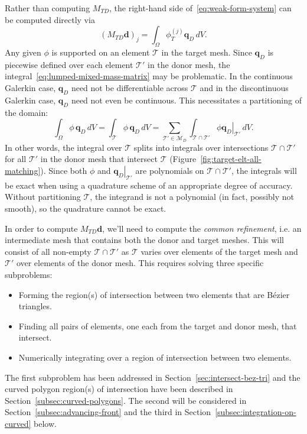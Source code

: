Rather than computing \(M_{TD}\), the right-hand side
of~\eqref{eq:weak-form-system} can be computed directly via
\begin{equation}\label{eq:lumped-mixed-mass-matrix}
\left(M_{TD} \bm{d}\right)_j = \int_{\Omega} \phi_T^{(j)} \bm{q}_D \, dV.
\end{equation}
Any given \(\phi\) is supported on an element \(\mathcal{T}\) in the
target mesh. Since \(\bm{q}_D\) is piecewise defined over each element
\(\mathcal{T}'\) in the donor mesh, the
integral~\eqref{eq:lumped-mixed-mass-matrix} may be problematic.
In the continuous Galerkin case, \(\bm{q}_D\) need not be differentiable
across \(\mathcal{T}\) and in the discontinuous Galerkin case,
\(\bm{q}_D\) need not even be continuous. This necessitates a
partitioning of the domain:
\begin{equation}
\int_{\Omega} \phi \, \bm{q}_D \, dV =
  \int_{\mathcal{T}} \phi \, \bm{q}_D \, dV =
  \sum_{\mathcal{T}' \in \mathcal{M}_D} \int_{\mathcal{T} \cap \mathcal{T}'}
    \phi \left.\bm{q}_D\right|_{\mathcal{T}'} \, dV.
\end{equation}
In other words, the integral over \(\mathcal{T}\) splits into integrals
over intersections \(\mathcal{T} \cap \mathcal{T}'\) for all
\(\mathcal{T}'\) in the donor mesh that intersect \(\mathcal{T}\)
(Figure~\ref{fig:target-elt-all-matching}). Since both \(\phi\) and
\(\left.\bm{q}_D\right|_{\mathcal{T}'}\) are polynomials on
\(\mathcal{T} \cap \mathcal{T}'\), the integrals will be exact when
using a quadrature scheme of an appropriate degree of accuracy.
Without partitioning \(\mathcal{T}\), the integrand is not a polynomial
(in fact, possibly not smooth), so the quadrature cannot be exact.

In order to compute \(M_{TD} \bm{d}\), we'll need to compute the
\emph{common refinement}, i.e. an intermediate mesh that contains
both the donor and target meshes. This will consist of all non-empty
\(\mathcal{T} \cap \mathcal{T}'\) as \(\mathcal{T}\) varies over
elements of the target mesh and \(\mathcal{T}'\) over elements of the
donor mesh. This requires solving three specific subproblems:
\begin{itemize}
\itemsep 0em
\item Forming the region(s) of intersection between two elements that
  are B\'{e}zier triangles.
\item Finding all pairs of elements, one each from the target and donor mesh,
  that intersect.
\item Numerically integrating over a region of intersection between two
  elements.
\end{itemize}
The first subproblem has been addressed in Section~\ref{sec:intersect-bez-tri}
and the curved polygon region(s) of intersection have been described
in Section~\ref{subsec:curved-polygons}. The second will be considered
in Section~\ref{subsec:advancing-front} and the third in
Section~\ref{subsec:integration-on-curved} below.

